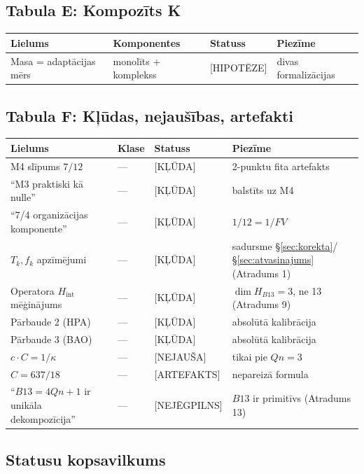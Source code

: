 \documentclass[12pt,a4paper]{article}
\begin{document}
\subsection*{Tabula E: Kompozīts K}

\begin{longtable}{|l|l|l|l|}
\hline
\textbf{Lielums} & \textbf{Komponentes} & \textbf{Statuss} & \textbf{Piezīme} \\
\hline
\endhead
Masa = adaptācijas mērs & monolīts + komplekss & [HIPOTĒZE] & divas formalizācijas \\
\hline
\end{longtable}

\subsection*{Tabula F: Kļūdas, nejaušības, artefakti}

\begin{longtable}{|l|l|l|l|}
\hline
\textbf{Lielums} & \textbf{Klase} & \textbf{Statuss} & \textbf{Piezīme} \\
\hline
\endhead
M4 slīpums $7/12$ & --- & [KĻŪDA] & 2-punktu fita artefakts \\
``M3 praktiski kā nulle'' & --- & [KĻŪDA] & balstīts uz M4 \\
``7/4 organizācijas komponente'' & --- & [KĻŪDA] & $1/12=1/FV$ \\
$T_k, f_k$ apzīmējumi & --- & [KĻŪDA] & sadursme \S\ref{sec:korekta}/\S\ref{sec:atvasinajums} (Atradums 1) \\
Operatora $H_{\text{int}}$ mēģinājums & --- & [KĻŪDA] & $\dim H_{B13}=3$, ne 13 (Atradums 9) \\
Pārbaude 2 (HPA) & --- & [KĻŪDA] & absolūtā kalibrācija \\
Pārbaude 3 (BAO) & --- & [KĻŪDA] & absolūtā kalibrācija \\
$c\cdot C = 1/\kappa$ & --- & [NEJAUŠA] & tikai pie $Qn=3$ \\
$C = 637/18$ & --- & [ARTEFAKTS] & nepareizā formula \\
``$B13 = 4Qn+1$ ir unikāla dekompozīcija'' & --- & [NEJĒGPILNS] & $B13$ ir primitīvs (Atradums 13) \\
\hline
\end{longtable}

\subsection*{Statusu kopsavilkums}
\end{document}
